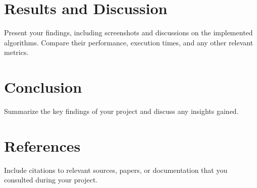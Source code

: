 \documentclass[10pt,twocolumn]{article}
\begin{document}
\section*{Results and Discussion}
Present your findings, including screenshots and discussions on the implemented algorithms. Compare their performance, execution times, and any other relevant metrics.

\section*{Conclusion}
Summarize the key findings of your project and discuss any insights gained.

\section*{References}
Include citations to relevant sources, papers, or documentation that you consulted during your project.
\end{document}
